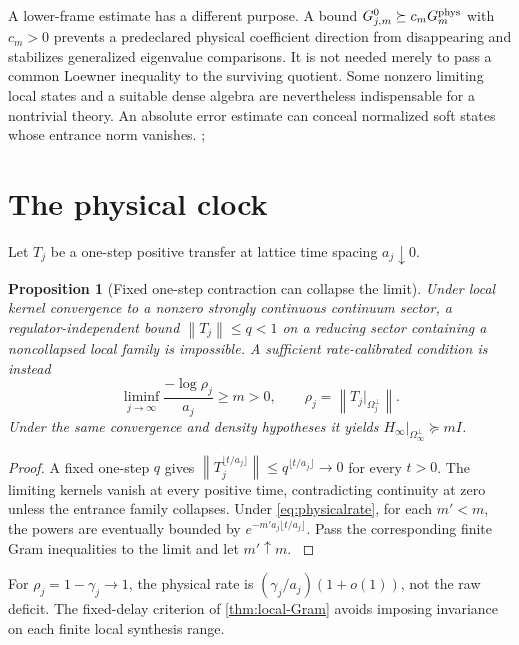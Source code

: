 \documentclass[11pt,oneside,openany]{book}
\newtheorem{proposition}[proposition]{Proposition}
\theoremstyle{definition}
\theoremstyle{remark}
\newcommand{\norm}[1]{\left\lVert#1\right\rVert}
\newcommand{\src}[2]{\cite[#2]{#1}}
\begin{document}
A lower-frame estimate has a different purpose. A bound $G_{j,m}^0\succeq c_mG_m^{\rm phys}$ with $c_m>0$ prevents a predeclared physical coefficient direction from disappearing and stabilizes generalized eigenvalue comparisons. It is not needed merely to pass a common Loewner inequality to the surviving quotient. Some nonzero limiting local states and a suitable dense algebra are nevertheless indispensable for a nontrivial theory. An absolute error estimate can conceal normalized soft states whose entrance norm vanishes. \src{F1}{V1}; \cite{GT}

\section{The physical clock}
Let $T_j$ be a one-step positive transfer at lattice time spacing $a_j\downarrow0$.

\begin{proposition}[Fixed one-step contraction can collapse the limit]\label{prop:step-collapse}
Under local kernel convergence to a nonzero strongly continuous continuum sector, a regulator-independent bound $\norm{T_j}\le q<1$ on a reducing sector containing a noncollapsed local family is impossible. A sufficient rate-calibrated condition is instead
\begin{equation}\label{eq:physicalrate}
\liminf_{j\to\infty}\frac{-\log\rho_j}{a_j}\ge m>0,
\qquad \rho_j=\norm{T_j|_{\Omega_j^\perp}}.
\end{equation}
Under the same convergence and density hypotheses it yields $H_\infty|_{\Omega_\infty^\perp}\succeq mI$.
\end{proposition}
\begin{proof}
A fixed one-step $q$ gives $\norm{T_j^{\lfloor t/a_j\rfloor}}\le q^{\lfloor t/a_j\rfloor}\to0$ for every $t>0$. The limiting kernels vanish at every positive time, contradicting continuity at zero unless the entrance family collapses. Under \cref{eq:physicalrate}, for each $m'<m$, the powers are eventually bounded by $e^{-m'a_j\lfloor t/a_j\rfloor}$. Pass the corresponding finite Gram inequalities to the limit and let $m'\uparrow m$. \src{F1}{V1}
\end{proof}

For $\rho_j=1-\gamma_j\to1$, the physical rate is $(\gamma_j/a_j)(1+o(1))$, not the raw deficit. The fixed-delay criterion of \cref{thm:local-Gram} avoids imposing invariance on each finite local synthesis range.
\end{document}
